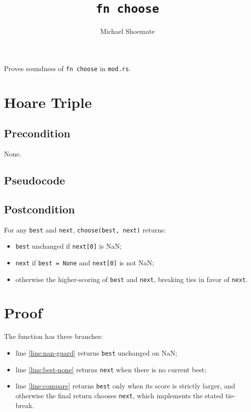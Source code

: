 \documentclass{article}
\title{\texttt{fn choose}}
\author{Michael Shoemate}
\date{}
\begin{document}
\maketitle

Proves soundness of \texttt{fn choose} in \texttt{mod.rs}.

\section{Hoare Triple}
\subsection*{Precondition}
None.

\subsection*{Pseudocode}


\subsection*{Postcondition}
\begin{theorem}
\label{postcondition}
For any \texttt{best} and \texttt{next}, \texttt{choose(best, next)} returns:
\begin{itemize}
    \item \texttt{best} unchanged if \texttt{next[0]} is NaN;
    \item \texttt{next} if \texttt{best = None} and \texttt{next[0]} is not NaN;
    \item otherwise the higher-scoring of \texttt{best} and \texttt{next}, breaking ties in favor
    of \texttt{next}.
\end{itemize}
\end{theorem}

\section{Proof}
The function has three branches:
\begin{itemize}
    \item line \ref{line:nan-guard} returns \texttt{best} unchanged on NaN;
    \item line \ref{line:best-none} returns \texttt{next} when there is no current best;
    \item line \ref{line:compare} returns \texttt{best} only when its score is strictly larger,
    and otherwise the final return chooses \texttt{next}, which implements the stated tie-break.
\end{itemize}
\end{document}
